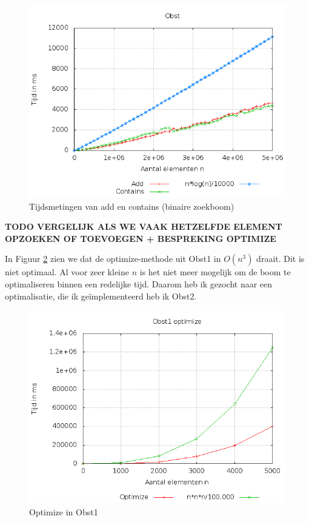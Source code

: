 \documentclass[titlepage,a4paper]{article}
\begin{document}
\begin{figure}[here]
\includegraphics[width=0.9\linewidth]{../Resultaten/obst2.png}
\caption{Tijdsmetingen van add en contains (binaire zoekboom)}
\label{obst_add_contains}
\end{figure}

\textbf{TODO VERGELIJK ALS WE VAAK HETZELFDE ELEMENT OPZOEKEN OF TOEVOEGEN + BESPREKING OPTIMIZE}

In Figuur \ref{obst1_optimize} zien we dat de optimize-methode uit Obst1 in $O(n^3)$ draait. Dit is niet optimaal. Al voor zeer kleine $n$ is het niet meer mogelijk om de boom te optimaliseren binnen een redelijke tijd. Daarom heb ik gezocht naar een optimalisatie, die ik ge\"implementeerd heb ik Obst2.

\begin{figure}[here]
\includegraphics[width=0.9\linewidth]{../Resultaten/obst1_optimize.png}
\caption{Optimize in Obst1}
\label{obst1_optimize}
\end{figure}
\end{document}
